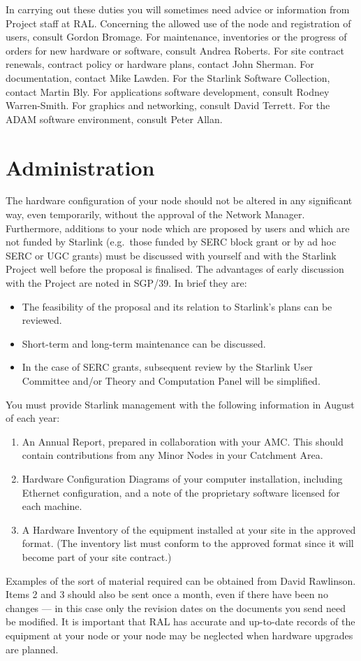 In carrying out these duties you will sometimes need advice or information
from Project staff at RAL.
Concerning the allowed use of the node and registration of users, consult
Gordon Bromage.
For maintenance, inventories or the progress of orders for new hardware or
software, consult Andrea Roberts.
For site contract renewals, contract policy or hardware plans, contact John
Sherman.
For documentation, contact Mike Lawden.
For the Starlink Software Collection, contact Martin Bly.
For applications software development, consult Rodney Warren-Smith.
For graphics and networking, consult David Terrett.
For the ADAM software environment, consult Peter Allan.

\section {Administration}

The hardware configuration of your node should not be altered in any significant
way, even temporarily, without the approval of the Network Manager.
Furthermore, additions to your node which are proposed by users and which are
not funded by Starlink (e.g.\ those funded by SERC block grant or by ad hoc SERC
or UGC grants) must be discussed with yourself and with the Starlink Project
well before the proposal is finalised.
The advantages of early discussion with the Project are noted in SGP/39.
In brief they are:
\begin{itemize}
\item The feasibility of the proposal and its relation to Starlink's plans can
be reviewed.
\item Short-term and long-term maintenance can be discussed.
\item In the case of SERC grants, subsequent review by the Starlink User
Committee and/or Theory and Computation Panel will be simplified.
\end{itemize}
You must provide Starlink management with the following information in August
of each year:
\begin{enumerate}
\item An Annual Report, prepared in collaboration with your AMC.
This should contain contributions from any Minor Nodes in your Catchment Area.
\item Hardware Configuration Diagrams of your computer installation, including
Ethernet configuration, and a note of the proprietary software licensed for
each machine.
\item A Hardware Inventory of the equipment installed at your site in the
approved format.
(The inventory list must conform to the approved format since it will become
part of your site contract.)
\end{enumerate}
Examples of the sort of material required can be obtained from David Rawlinson.
Items 2 and 3 should also be sent once a month, even if there have been no
changes --- in this case only the revision dates on the documents you send need
be modified.
It is important that RAL has accurate and up-to-date records of the equipment
at your node or your node may be neglected when hardware upgrades are planned.

